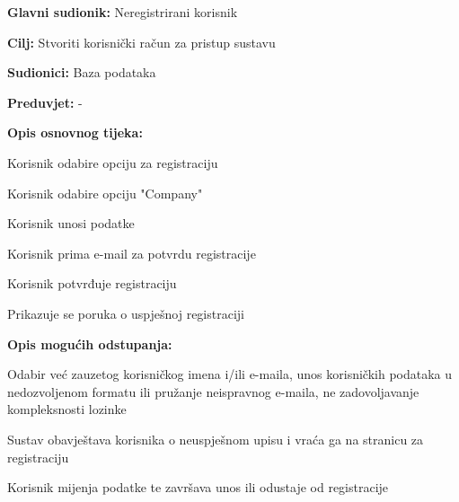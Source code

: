 					\noindent {}
					\begin{packed_item}
	
						\item \textbf{Glavni sudionik: }Neregistrirani korisnik
						\item  \textbf{Cilj:} Stvoriti korisnički račun za pristup sustavu
						\item  \textbf{Sudionici:} Baza podataka
						\item  \textbf{Preduvjet:} -
						\item  \textbf{Opis osnovnog tijeka:}
						
						\item[] \begin{packed_enum}
	
							\item Korisnik odabire opciju za registraciju
							\item Korisnik odabire opciju "Company"
							\item Korisnik unosi podatke
							\item Korisnik prima e-mail za potvrdu registracije
							\item Korisnik potvrđuje registraciju
							\item Prikazuje se poruka o uspješnoj registraciji

						\end{packed_enum}
						
						\item  \textbf{Opis mogućih odstupanja:}
						
						\item[] \begin{packed_item}
	
							\item[2.a] Odabir već zauzetog korisničkog imena i/ili e-maila, unos korisničkih podataka u nedozvoljenom formatu ili pružanje neispravnog e-maila, ne zadovoljavanje kompleksnosti lozinke
							\item[] \begin{packed_enum}
								
								\item Sustav obavještava korisnika o neuspješnom upisu i vraća ga na stranicu za registraciju
								\item Korisnik mijenja podatke te završava unos ili odustaje od registracije
								
							\end{packed_enum}
							
						\end{packed_item}
					\end{packed_item}
					
